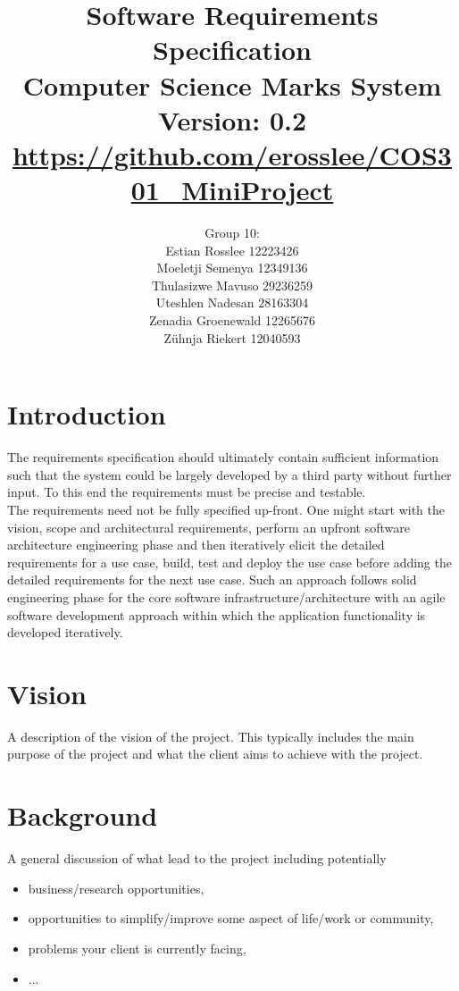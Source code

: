 \documentclass[11pt,a4paper]{article}
\begin{document}
\begin{titlepage}
\title{Software Requirements Specification\\Computer Science Marks System\\ \small Version: 0.2\\ \url{https://github.com/erosslee/COS301_MiniProject}}
\author{Group 10: \\Estian Rosslee 12223426\\Moeletji Semenya 12349136\\Thulasizwe Mavuso 29236259\\Uteshlen Nadesan 28163304\\Zenadia Groenewald 12265676\\Z\"uhnja Riekert 12040593}
\maketitle
\end{titlepage}
\pagebreak
\tableofcontents
\pagebreak
\section{Introduction}
The requirements specification should ultimately contain sufficient information such that the system could be largely developed by a third party without further input. To this end the requirements must be precise and testable.
\\

The requirements need not be fully specified up-front. One might start with the vision, scope and architectural requirements, perform an upfront software architecture engineering phase and then iteratively elicit the detailed requirements for a use case, build, test and deploy the use case before adding the detailed requirements for the next use case. Such an approach follows solid engineering phase for the core software infrastructure/architecture with an agile software development approach within which the application functionality is developed iteratively.
\section{Vision}
A description of the vision of the project. This typically includes the main purpose of the project and what the client aims to achieve with the project.
\section{Background}
A general discussion of what lead to the project including potentially
\begin{itemize}
\item business/research opportunities,
\item opportunities to simplify/improve some aspect of life/work or community,
\item problems your client is currently facing,
\item ...
\end{itemize}
\end{document}
